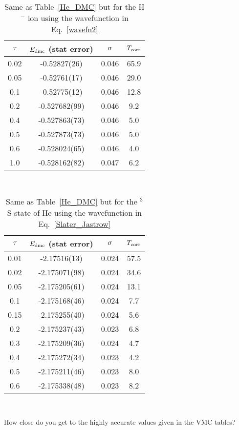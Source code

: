 \documentclass[11pt,aps,prb,amsmath,amssymb,superscriptaddress,notitlepage]{revtex4-1}
\def\Tcorr{T_{\rm corr}}
\providecommand{\tabularnewline}{\\}
\begin{document}
{\begin{table}[H]
\begin{center}
\color{blue}
\caption{Same as Table~\ref{He_DMC} but for the H$^-$ ion using the wavefunction in Eq.~\ref{wavefn2}}
\label{H-_DMC}
\begin{tabular}{|c|c|c|c|}
\hline 
$\tau$ & \multicolumn{1}{c}{$E_{\rm dmc}$ (stat error)} | & $\sigma$ & $\Tcorr$ \tabularnewline
\hline 
0.02 & -0.52827(26)  & 0.046 & 65.9 \tabularnewline
0.05 & -0.52761(17)  & 0.046 & 29.0 \tabularnewline
0.1  & -0.52775(12)  & 0.046 & 12.8 \tabularnewline
0.2  & -0.527682(99) & 0.046 & 9.2 \tabularnewline
0.4  & -0.527863(73) & 0.046 & 5.0 \tabularnewline
0.5  & -0.527873(73) & 0.046 & 5.0 \tabularnewline
0.6  & -0.528024(65) & 0.046 & 4.0 \tabularnewline
1.0  & -0.528162(82) & 0.047 & 6.2 \tabularnewline
\hline 
\end{tabular}\\
\end{center}
\end{table}


\begin{table}[H]
\begin{center}
\color{blue}
\caption{Same as Table~\ref{He_DMC} but for the $^3$S state of He using the wavefunction in Eq.~\ref{Slater_Jastrow}}
\label{H-_DMC}
\begin{tabular}{|c|c|c|c|}
\hline 
$\tau$ & \multicolumn{1}{c}{$E_{\rm dmc}$ (stat error)} | & $\sigma$ & $\Tcorr$ \tabularnewline
\hline 
0.01 & -2.17516(13) & 0.024 & 57.5 \tabularnewline
0.02 & -2.175071(98) & 0.024 & 34.6 \tabularnewline
0.05 & -2.175205(61) & 0.024 & 13.1 \tabularnewline
0.1 &  -2.175168(46) & 0.024 & 7.7 \tabularnewline
0.15 & -2.175255(40) & 0.024 & 5.6 \tabularnewline
0.2 & -2.175237(43) & 0.023 & 6.8 \tabularnewline
0.3 & -2.175209(36) & 0.024 & 4.7 \tabularnewline
0.4 & -2.175272(34) & 0.023 & 4.2 \tabularnewline
0.5 & -2.175211(46) & 0.023 & 8.0  \tabularnewline
0.6 & -2.175338(48) & 0.023 & 8.2 \tabularnewline
\hline 
\end{tabular}\\
\end{center}
\end{table}

How close do you get to the highly accurate values given in the VMC tables?

}
\end{document}
